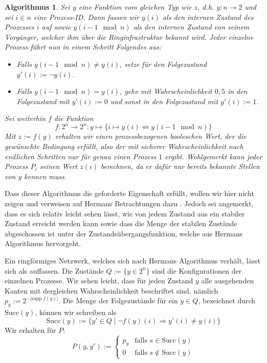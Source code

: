 \documentclass[a4paper]{article}
\newtheorem{algorithmus}[satz]{Algorithmus}
\theoremstyle{nonumberplain}
\begin{document}
\begin{algorithmus}
	Sei $y$ eine Funktion vom gleichen Typ wie $z$, d.h. $y : n \to 2$ und sei $i \in n$ eine Prozess-ID. Dann fassen wir $y(i)$ als den internen Zustand des Prozesses $i$ auf sowie $y(i - 1 \mod n)$ als den internen Zustand von seinem Vorgänger, welcher ihm über die Ringinfrastruktur bekannt wird. Jeder einzelne Prozess führt nun in einem Schritt Folgendes aus:
	\begin{itemize}
		\item Falls $y(i-1 \mod n) \neq y(i)$, setze für den Folgezustand $y'(i) := \neg y(i)$.
		\item Falls $y(i-1 \mod n) =    y(i)$, gehe mit Wahrscheinlichkeit $0,5$ in den Folgezustand mit $y'(i) := 0$ und sonst in den Folgezustand mit $y'(i) := 1$.
	\end{itemize}
	Sei weiterhin $f$ die Funktion
	\[
	f : 2^n \to 2^n : y \mapsto \{i \mapsto y(i) \Leftrightarrow y(i-1 \mod n) \}
	\]
	Mit $z := f(y)$ erhalten wir einen prozessbezogenen booleschen Wert, der die gewünschte Bedingung erfüllt, also der mit sicherer Wahrscheinlichkeit nach endlichen Schritten nur für genau einen Prozess $1$ ergibt. Wohlgemerkt kann jeder Prozess $P_i$ seinen Wert $z(i)$ berechnen, da er dafür nur bereits bekannte Stellen von $y$ kennen muss.
\end{algorithmus}

Dass dieser Algorithmus die geforderte Eigenschaft erfüllt, wollen wir hier nicht zeigen und verweisen auf Hermans Betrachtungen dazu \cite{Her90}. Jedoch sei angemerkt, dass es sich relativ leicht sehen lässt, wie von jedem Zustand aus ein stabiler Zustand erreicht werden kann sowie dass die Menge der stabilen Zustände abgeschossen ist unter der Zustandsübergangsfunktion, welche aus Hermans Algorithmus hervorgeht.


Ein ringförmiges Netzwerk, welches sich nach Hermans Algorithmus verhält, lässt sich als \mc{} \mcex{} auffassen. Die Zustände $Q := \{ y \in 2^n\}$ sind die Konfigurationen der einzelnen Prozesse. Wir sehen leicht, dass für jeden Zustand $y$ alle ausgehenden Kanten mit dergleichen Wahrscheinlichkeit beschriftet sind, nämlich $p_y := 2^{-|\mathrm{supp}\>f(y)|}$. Die Menge der Folgezustände für ein $y \in Q$, bezeichnet durch $\mathrm{Succ}(y)$, können wir schreiben als
\[
	\mathrm{Succ}(y) := \{ y' \in Q \mid \neg f(y)(i) \Rightarrow y'(i) \neq y(i) \}
\]
Wir erhalten für $P$:
\begin{equation}
	P(y,y') := \begin{cases}
		p_y & \text{falls } s\in \mathrm{Succ}(y)\\
		0 & \text{falls } s\notin \mathrm{Succ}(y)
	\end{cases}
\end{equation}
\end{document}
